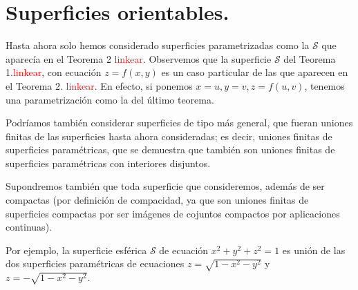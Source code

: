 \documentclass[12pt,twoside]{report}
\newcommand\mc[1]{\mathcal{#1}}
\theoremstyle{azul}
\theoremstyle{azul2}
\theoremstyle{plain}
\theoremstyle{definition}
\theoremstyle{remark}
\begin{document}
\section{Superficies orientables.}
 
 Hasta ahora solo hemos considerado superficies parametrizadas como la $\mc{S}$ que aparecía en el Teorema 2 \textcolor{red}{linkear}. Observemos que la superficie $\mc{S}$ del Teorema 1.\textcolor{red}{linkear}, con ecuación $z=f(x,y)$ es un caso particular de las que aparecen en el Teorema 2. \textcolor{red}{linkear}. En efecto, si ponemos $x=u, y=v, z=f(u,v)$, tenemos una parametrización como la del último teorema. 
 
 Podríamos también considerar superficies de tipo más general, que fueran uniones finitas de las superficies hasta ahora consideradas; es decir, uniones finitas de superficies paramétricas, que se demuestra que también son uniones finitas de superficies paramétricas con interiores disjuntos. 
 
 Supondremos también que toda superficie que consideremos, además de ser compactas (por definición de compacidad, ya que son uniones finitas de superficies compactas por ser imágenes de cojuntos compactos por aplicaciones continuas).
 
 Por ejemplo, la superficie esférica $\mc{S}$ de ecuación $x^2+y^2+z^2=1$ es unión de las dos superficies paramétricas de ecuaciones $z= \sqrt{1-x^2-y^2}$ y $z=-\sqrt{1-x^2-y^2}$. 
 
\end{document}

